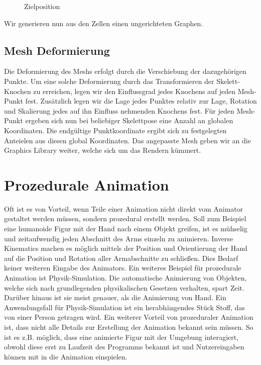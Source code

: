 \begin{figure}[!htb]
	\caption{Zielposition}\label{fig:marching_square_example_solved}
	\endminipage\hfill
\end{figure}
%
Wir generieren nun aus den Zellen einen ungerichteten Graphen.
%
\subsection{Mesh Deformierung}
Die Deformierung des Meshs erfolgt durch die Verschiebung der dazugehörigen Punkte. Um eine solche Deformierung durch das Transformieren der Skelett-Knochen zu erreichen, legen wir den Einflussgrad jedes Knochens auf jeden Mesh-Punkt fest. Zusätzlich legen wir die Lage jedes Punktes relativ zur Lage, Rotation und Skalierung jedes auf ihn Einfluss nehmenden Knochens fest. Für jeden Mesh-Punkt ergeben sich nun bei beliebiger Skelettpose eine Anzahl an globalen Koordinaten. Die endgültige Punktkoordinate ergibt sich zu festgelegten Anteielen aus diesen global Koordinaten. Das angepasste Mesh geben wir an die Graphics Library weiter, welche sich um das Rendern kümmert.
%
\section{Prozedurale Animation}
Oft ist es von Vorteil, wenn Teile einer Animation nicht direkt vom Animator gestaltet werden müssen, sondern prozedural erstellt werden. Soll zum Beispiel eine humanoide Figur mit der Hand nach einem Objekt greifen, ist es mühselig und zeitaufwendig jeden Abschnitt des Arms einzeln zu animieren. Inverse Kinematics machen es möglich mittels der Position und Orientierung der Hand auf die Position und Rotation aller Armabschnitte zu schließen. Dies Bedarf keiner weiteren Eingabe des Animators.\newline\newline
Ein weiteres Beispiel für prozedurale Animation ist Physik-Simulation. Die automatische Animierung von Objekten, welche sich nach grundlegenden physikalischen Gesetzen verhalten, spart Zeit. Darüber hinaus ist sie meist genauer, als die Animierung von Hand. Ein Anwendungsfall für Physik-Simulation ist ein herabhängendes Stück Stoff, das von einer Person getragen wird.\newline\newline
Ein weiterer Vorteil von prozeduraler Animation ist, dass nicht alle Details zur Erstellung der Animation bekannt sein müssen. So ist es z.B. möglich, dass eine animierte Figur mit der Umgebung interagiert, obwohl diese erst zu Laufzeit des Programms bekannt ist und Nutzereingaben können mit in die Animation einspielen.
%
